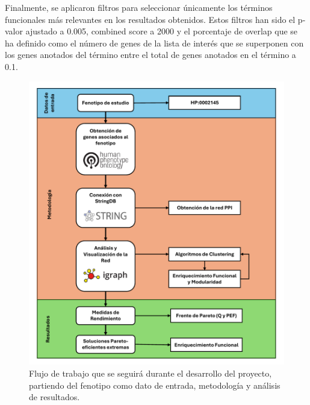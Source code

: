 Finalmente, se aplicaron filtros para seleccionar únicamente los términos funcionales más relevantes en los resultados obtenidos. Estos filtros han sido el p-valor ajustado a  0.005,
combined score a  2000 y el porcentaje de overlap que se ha definido como  el número de genes de la lista de interés que se superponen con los genes anotados del término entre el total de genes anotados en el término a 0.1.


\begin{figure}[h]
	\centering
	\includegraphics[width=1\linewidth]{figures/methods/Flujo_de_trabajo_final.pdf}
	\caption{Flujo de trabajo que se seguirá durante el desarrollo del proyecto, partiendo del fenotipo como dato de entrada, metodología y análisis de resultados.}
	\label{fig:flujo_trabajo}
\end{figure}

